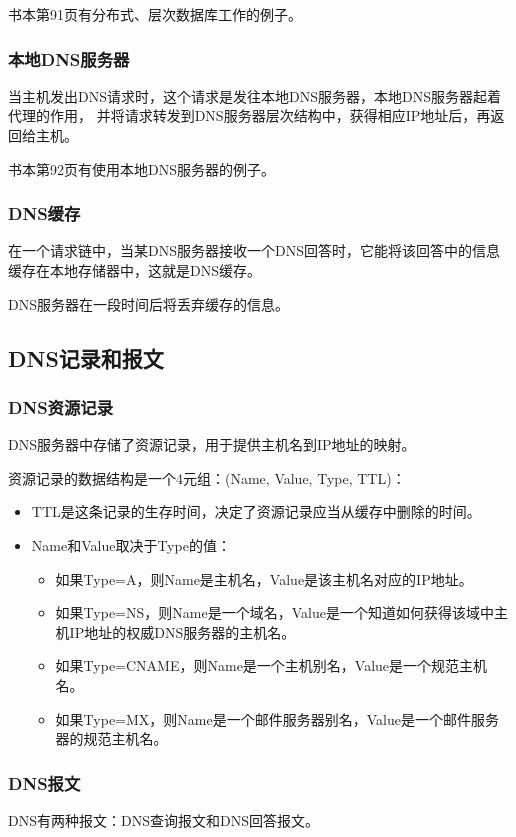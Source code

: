 \documentclass[a4paper,left=2.5cm,right=2.5cm,11pt]{article}
\begin{document}
	书本第91页有分布式、层次数据库工作的例子。

\subsubsection{本地DNS服务器}
	当主机发出DNS请求时，这个请求是发往本地DNS服务器，本地DNS服务器起着代理的作用，
	并将请求转发到DNS服务器层次结构中，获得相应IP地址后，再返回给主机。\par

	书本第92页有使用本地DNS服务器的例子。

\subsubsection{DNS缓存}
	在一个请求链中，当某DNS服务器接收一个DNS回答时，它能将该回答中的信息缓存在本地存储器中，这就是DNS缓存。\par

	DNS服务器在一段时间后将丢弃缓存的信息。

\subsection{DNS记录和报文}
\subsubsection{DNS资源记录}
	DNS服务器中存储了资源记录，用于提供主机名到IP地址的映射。\par

	资源记录的数据结构是一个4元组：(Name, Value, Type, TTL)：
	\begin{itemize}
		\item TTL是这条记录的生存时间，决定了资源记录应当从缓存中删除的时间。
		\item Name和Value取决于Type的值：
		\begin{itemize}
			\item 如果Type=A，则Name是主机名，Value是该主机名对应的IP地址。
			\item 如果Type=NS，则Name是一个域名，Value是一个知道如何获得该域中主机IP地址的权威DNS服务器的主机名。
			\item 如果Type=CNAME，则Name是一个主机别名，Value是一个规范主机名。
			\item 如果Type=MX，则Name是一个邮件服务器别名，Value是一个邮件服务器的规范主机名。
		\end{itemize}
	\end{itemize}

\subsubsection{DNS报文}
	DNS有两种报文：DNS查询报文和DNS回答报文。\par
\end{document}
